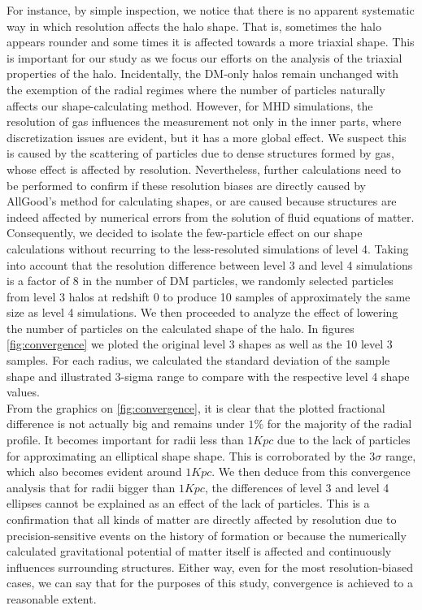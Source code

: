 For instance, by simple inspection, we notice that there is no apparent systematic way in which resolution affects the halo shape. That is, sometimes the halo appears rounder and some times it is affected towards a more triaxial shape. This is important for our study as we focus our efforts on the analysis of the triaxial properties of the halo. Incidentally, the DM-only halos remain unchanged with the exemption of the radial regimes where the number of particles naturally affects our shape-calculating method. However, for MHD simulations, the resolution of gas influences the measurement not only in the inner parts, where discretization issues are evident, but it has a more global effect. We suspect this is caused by the scattering of particles due to dense structures formed by gas, whose effect is affected by resolution. Nevertheless, further calculations need to be performed to confirm if these resolution biases are directly caused by AllGood's method for calculating shapes, or are caused because structures are indeed affected by numerical errors from the solution of fluid equations of matter.\\

Consequently, we decided to isolate the few-particle effect on our shape calculations without recurring to the less-resoluted simulations of level 4. Taking into account that the resolution difference between level 3 and level 4 simulations is a factor of 8 in the number of DM particles, we randomly selected particles from level 3 halos at redshift 0 to produce 10 samples of approximately the same size as level 4 simulations. We then proceeded to analyze the effect of lowering the number of particles on the calculated shape of the halo. In figures \ref{fig:convergence} we ploted the original level 3 shapes as well as the 10 level 3 samples. For each radius, we calculated the standard deviation of the sample shape and illustrated 3-sigma range to compare with the respective level 4 shape values.\\  

From the graphics on \ref{fig:convergence}, it is clear that the plotted fractional difference is not actually big and remains under $1\%$ for the majority of the radial profile. It becomes important for radii less than $1Kpc$ due to the lack of particles for approximating an elliptical shape shape. This is corroborated by the $3\sigma$ range, which also becomes evident around $1Kpc$. We then deduce from this convergence analysis that for radii bigger than $1Kpc$, the differences of level 3 and level 4 ellipses cannot be explained as an effect of the lack of particles. This is a confirmation that all kinds of matter are directly affected by resolution due to precision-sensitive events on the history of formation or because the numerically calculated gravitational potential of matter itself is affected and continuously influences surrounding structures. Either way, even for the most resolution-biased cases, we can say that for the purposes of this study, convergence is achieved to a reasonable extent.\\  

